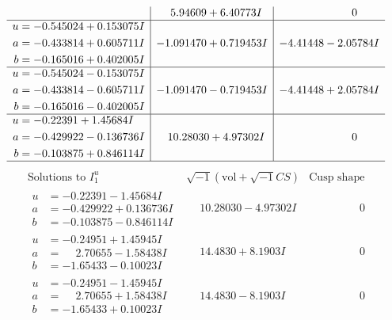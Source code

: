 \documentclass[1p]{elsarticle_modified}
\theoremstyle{definition}
\newcommand{\I}{\sqrt{-1}}
\begin{document}
$$\begin{array}{c|c|c}
 & \phantom{-}5.94609 + 6.40773 I & \phantom{-0.000000 } 0 \\ \hline\begin{aligned}
u &= -0.545024 + 0.153075 I \\
a &= -0.433814 + 0.605711 I \\
b &= -0.165016 + 0.402005 I\end{aligned}
 & -1.091470 + 0.719453 I & -4.41448 - 2.05784 I \\ \hline\begin{aligned}
u &= -0.545024 - 0.153075 I \\
a &= -0.433814 - 0.605711 I \\
b &= -0.165016 - 0.402005 I\end{aligned}
 & -1.091470 - 0.719453 I & -4.41448 + 2.05784 I \\ \hline\begin{aligned}
u &= -0.22391 + 1.45684 I \\
a &= -0.429922 - 0.136736 I \\
b &= -0.103875 + 0.846114 I\end{aligned}
 & \phantom{-}10.28030 + 4.97302 I & \phantom{-0.000000 } 0\\
 \hline 
 \end{array}$$\newpage$$\begin{array}{c|c|c}  
\text{Solutions to }I^u_{1}& \I (\text{vol} + \sqrt{-1}CS) & \text{Cusp shape}\\
 \hline 
\begin{aligned}
u &= -0.22391 - 1.45684 I \\
a &= -0.429922 + 0.136736 I \\
b &= -0.103875 - 0.846114 I\end{aligned}
 & \phantom{-}10.28030 - 4.97302 I & \phantom{-0.000000 } 0 \\ \hline\begin{aligned}
u &= -0.24951 + 1.45945 I \\
a &= \phantom{-}2.70655 - 1.58438 I \\
b &= -1.65433 - 0.10023 I\end{aligned}
 & \phantom{-}14.4830 + 8.1903 I & \phantom{-0.000000 } 0 \\ \hline\begin{aligned}
u &= -0.24951 - 1.45945 I \\
a &= \phantom{-}2.70655 + 1.58438 I \\
b &= -1.65433 + 0.10023 I\end{aligned}
 & \phantom{-}14.4830 - 8.1903 I & \phantom{-0.000000 } 0 \\ \hline\begin{aligned}

\end{aligned}
\end{array}$$
\end{document}
